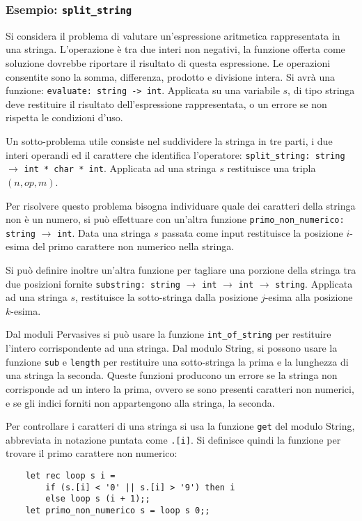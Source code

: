 \documentclass{article}
\numberwithin{equation}{subsection}
\begin{document}
\subsubsection{Esempio: \texttt{split\_string}}

Si considera il problema di valutare un'espressione aritmetica rappresentata in una stringa. L'operazione è tra due interi non negativi, la funzione offerta come soluzione dovrebbe riportare il risultato di questa espressione. Le operazioni consentite sono la somma, differenza, prodotto e divisione intera. 
Si avrà una funzione: \verb|evaluate: string -> int|. Applicata su una variabile $s$, di tipo stringa deve restituire il risultato dell'espressione rappresentata, o un errore se non rispetta le condizioni d'uso. 

Un sotto-problema utile consiste nel suddividere la stringa in tre parti, i due interi operandi ed il carattere che identifica l'operatore: \verb|split_string: string| $\rightarrow$ \verb|int * char * int|. Applicata ad una stringa $s$ restituisce una tripla $(n,op,m)$. 

Per risolvere questo problema bisogna individuare quale dei caratteri della stringa non è un numero, si può effettuare con un'altra funzione \verb|primo_non_numerico: string| $\rightarrow$ \verb|int|. Data una stringa $s$ passata come input restituisce la posizione $i$-esima del primo carattere non numerico nella stringa. 

Si può definire inoltre un'altra funzione per tagliare una porzione della stringa tra due posizioni fornite \verb|substring: string| $\rightarrow$ \verb|int| $\rightarrow$ \verb|int| $\rightarrow$ \verb|string|. Applicata ad una stringa $s$, restituisce la sotto-stringa dalla posizione $j$-esima alla posizione $k$-esima. 

Dal moduli Pervasives si può usare la funzione \verb|int_of_string| per restituire l'intero corrispondente ad una stringa. Dal modulo String, si possono usare la funzione \verb|sub| e \verb|length| per restituire una sotto-stringa la prima e la lunghezza di una stringa la seconda. 
Queste funzioni producono un errore se la stringa non corrisponde ad un intero la prima, ovvero se sono presenti caratteri non numerici, e se gli indici forniti non appartengono alla stringa, la seconda. 

Per controllare i caratteri di una stringa si usa la funzione \verb|get| del modulo String, abbreviata in notazione puntata come \verb|.[i]|. Si definisce quindi la funzione per trovare il primo carattere non numerico:
\begin{verbatim}
    let rec loop s i = 
        if (s.[i] < '0' || s.[i] > '9') then i
        else loop s (i + 1);;
    let primo_non_numerico s = loop s 0;;
\end{verbatim}
\end{document}
